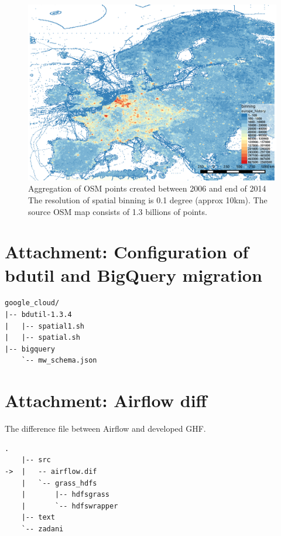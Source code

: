 \documentclass[a4paper,12pt,oneside]{report}
\begin{document}
			\begin{figure}[!htbp]
				\centering
				\includegraphics[width=1\textwidth]{./img/osm/history.png}
					\caption[GHF workflow]{\centering Aggregation of OSM points created between 2006 and end of 2014
						The resolution of spatial binning is 0.1 degree (approx 10km). The source OSM map consists of 1.3 billions of points.}
				\label{map_cz}
			\end{figure} 
\newpage		
	\section{Attachment: Configuration of  bdutil and BigQuery migration}\label{pythonscr}
	\begin{footnotesize}
	\begin{lstlisting}[style=mybash]
google_cloud/
|-- bdutil-1.3.4
|   |-- spatial1.sh
|   |-- spatial.sh
|-- bigquery
    `-- mw_schema.json

	\end{lstlisting}
	\end{footnotesize}
	
	
	
	\section{Attachment: Airflow diff}\label{airflow_diff}
	The difference file between Airflow and developed GHF.
\begin{footnotesize}
\begin{lstlisting}[style=mybash]
	.
	|-- src
->	|   -- airflow.dif
	|   `-- grass_hdfs
	|       |-- hdfsgrass
	|       `-- hdfswrapper
	|-- text
	`-- zadani
	
\end{lstlisting}
\end{footnotesize} 	
\end{document}
